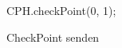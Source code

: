 \begin{wrapfigure}[3]{l}[0cm]{0.46\textwidth}
    \centering
    \vspace{-10px}
	\begin{spacing}{0.75}
		\begin{javacode}[firstnumber=48]
CPH.checkPoint(0, 1);\end{javacode}
	\end{spacing}
	\caption{CheckPoint senden}
\end{wrapfigure}